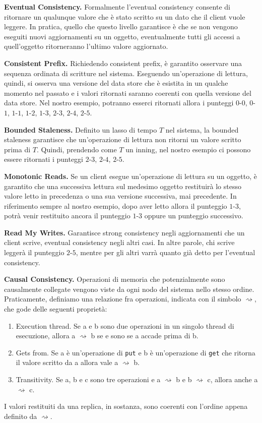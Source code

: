 \documentclass[twoside]{article}
\begin{document}
\begin{multicols}{2}
\textbf{Eventual Consistency.} Formalmente l'eventual consistency consente di ritornare un qualunque valore che è stato scritto su un dato che il client vuole leggere. In pratica, quello che questo livello garantisce è che se non vengono eseguiti nuovi aggiornamenti su un oggetto, eventualmente tutti gli accessi a quell'oggetto ritorneranno l'ultimo valore aggiornato.

\textbf{Consistent Prefix.} Richiedendo consistent prefix, è garantito osservare una sequenza ordinata di scritture nel sistema. Eseguendo un'operazione di lettura, quindi, si osserva una versione del data store che è esistita in un qualche momento nel passato e i valori ritornati saranno coerenti con quella versione del data store. Nel nostro esempio, potranno esserci ritornati allora i punteggi $0$-$0$, $0$-$1$, $1$-$1$, $1$-$2$, $1$-$3$, $2$-$3$, $2$-$4$, $2$-$5$.

\textbf{Bounded Staleness.} Definito un lasso di tempo $T$ nel sistema, la bounded staleness garantisce che un'operazione di lettura non ritorni un valore scritto prima di $T$. Quindi, prendendo come $T$ un inning, nel nostro esempio ci possono essere ritornati i punteggi $2$-$3$, $2$-$4$, $2$-$5$.

\textbf{Monotonic Reads.} Se un client esegue un'operazione di lettura su un oggetto, è garantito che una successiva lettura sul medesimo oggetto restituirà lo stesso valore letto in precedenza o una sua versione successiva, mai precedente. In riferimento sempre al nostro esempio, dopo aver letto allora il punteggio $1$-$3$, potrà venir restituito ancora il punteggio $1$-$3$ oppure un punteggio successivo.

\textbf{Read My Writes.} Garantisce strong consistency negli aggiornamenti che un client scrive, eventual consistency negli altri casi. In altre parole, chi scrive leggerà il punteggio $2$-$5$, mentre per gli altri varrà quanto già detto per l'eventual consistency.

\textbf{Causal Consistency.} Operazioni di memoria che potenzialmente sono causalmente collegate vengono viste da ogni nodo del sistema nello stesso ordine. Praticamente, definiamo una relazione fra operazioni, indicata con il simbolo $\rightsquigarrow$, che gode delle seguenti proprietà:
\begin{enumerate}[topsep=0pt,itemsep=-1ex,partopsep=1ex,parsep=1ex]
\item Execution thread. Se a e b sono due operazioni in un singolo thread di esecuzione, allora a $\rightsquigarrow$ b se e sono se a accade prima di b.
\item Gets from. Se a è un'operazione di \texttt{put} e b è un'operazione di \texttt{get} che ritorna il valore scritto da a allora vale a $\rightsquigarrow$ b.
\item Transitivity. Se a, b e c sono tre operazioni e a $\rightsquigarrow$ b e b $\rightsquigarrow$ c, allora anche a $\rightsquigarrow$ c.
\end{enumerate}
I valori restituiti da una replica, in sostanza, sono coerenti con l'ordine appena definito da $\rightsquigarrow$.


\end{multicols}
\end{document}
